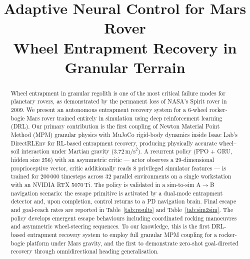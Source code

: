 \documentclass[conference]{IEEEtran}
\begin{document}
\title{Adaptive Neural Control for Mars Rover\\
       Wheel Entrapment Recovery in Granular Terrain}

\author{%
  \and
}

\maketitle

\begin{abstract}
Wheel entrapment in granular regolith is one of the most critical failure modes
for planetary rovers, as demonstrated by the permanent loss of NASA's Spirit rover
in 2009. We present an autonomous entrapment recovery system for a 6-wheel
rocker-bogie Mars rover trained entirely in simulation using deep reinforcement
learning (DRL). Our primary contribution is the first coupling of Newton Material
Point Method (MPM) granular physics with MuJoCo rigid-body dynamics inside Isaac
Lab's DirectRLEnv for RL-based entrapment recovery, producing physically accurate
wheel--soil interaction under Martian gravity ($3.72\,\text{m/s}^2$). A recurrent
policy (PPO + GRU, hidden size 256) with an asymmetric critic --- actor observes
a 29-dimensional proprioceptive vector, critic additionally reads 8 privileged
simulator features --- is trained for 200\,000 timesteps across 32 parallel
environments on a single workstation with an NVIDIA RTX 5070\,Ti. The policy is
validated in a sim-to-sim A$\to$B navigation scenario: the escape primitive is
activated by a dual-mode entrapment detector and, upon completion, control returns
to a PD navigation brain. Final escape and goal-reach rates are reported in
Table~\ref{tab:results} and Table~\ref{tab:sim2sim}. The policy develops emergent
escape behaviours including coordinated rocking manoeuvres and asymmetric
wheel-steering sequences. To our knowledge, this is the first DRL-based
entrapment recovery system to employ full granular MPM coupling for a rocker-bogie
platform under Mars gravity, and the first to demonstrate zero-shot goal-directed
recovery through omnidirectional heading generalisation.
\end{abstract}
\end{document}
